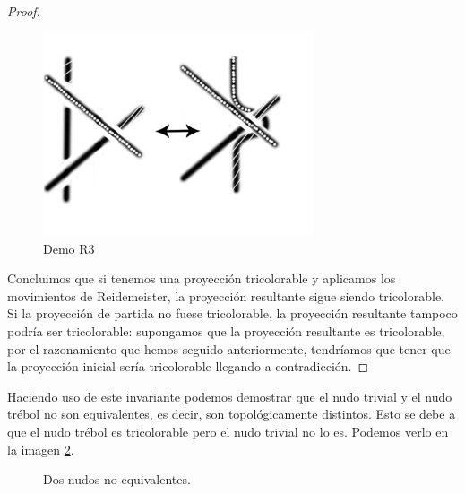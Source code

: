 \begin{teo}
\begin{proof}
\begin{figure}[h!]
			\includegraphics[width=8cm]{inudos/movi5tri4.png}
			\caption{Demo R3}
			\label{demotri4} 
		\end{figure}
		
		Concluimos que si tenemos una proyección tricolorable y aplicamos los movimientos de Reidemeister, la proyección resultante sigue siendo tricolorable. \\
		Si la proyección de partida no fuese tricolorable, la proyección resultante tampoco podría ser tricolorable: supongamos que la proyección resultante es tricolorable, por el razonamiento que hemos seguido anteriormente, tendríamos que tener que la proyección inicial sería tricolorable llegando a contradicción. 
		
	\end{proof}
\end{teo}


Haciendo uso de este invariante podemos demostrar que el nudo trivial y el nudo trébol no son equivalentes, es decir, son topológicamente distintos. Esto se debe a que el nudo trébol es tricolorable pero el nudo trivial no lo es. Podemos verlo en la imagen \ref{Tric2}.\\
\begin{figure}[h!]
	\centering
	\caption{Dos nudos no equivalentes.}
	\label{Tric2} 
\end{figure} 


